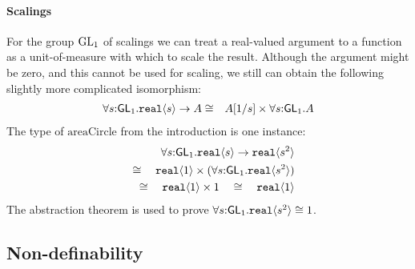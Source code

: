 \paragraph{Scalings}
For the group $\mathrm{GL}_1$ of scalings we can treat
a real-valued argument to a function as a unit-of-measure with
which to scale the result. 
Although the argument might be zero, and this cannot be used for scaling,
we still can obtain the following slightly more complicated
isomorphism:
\begin{eqnarray*}
\forall s\mathord:\mathsf{GL}_1.\textup{\texttt{real}}\langle s \rangle\to A
& \cong &
A[1/s]\times \forall s\mathord:\mathsf{GL}_1.A
\end{eqnarray*}
The type of $\mathrm{areaCircle}$ from the introduction is one instance:
\begin{eqnarray*}
\forall s\mathord:\mathsf{GL}_1.\textup{\texttt{real}}\langle s \rangle\to\textup{\texttt{real}}\langle s^2 \rangle\\ \quad\cong\quad \textup{\texttt{real}}\langle 1 \rangle\times(\forall
s\mathord:\mathsf{GL}_1.\textup{\texttt{real}}\langle s^2 \rangle)\\ \quad\cong\quad
\textup{\texttt{real}}\langle 1 \rangle\times 1\quad\cong\quad \textup{\texttt{real}}\langle 1 \rangle
\end{eqnarray*}
The abstraction theorem is used to prove
$\forall s\mathord:\mathsf{GL}_1.\textup{\texttt{real}}\langle s^2 \rangle\cong 1$.


\subsection{Non-definability}
\label{sec:types-indexed-abelian-groups-indef}

